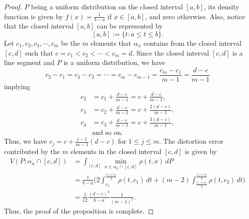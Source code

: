 \documentclass[12pt, reqno]{amsart}
\theoremstyle{plain}
\theoremstyle{definition}
\newcommand{\ii}{\cap}%
\newcommand{\set}[1]{\{#1\}}%
\newcommand{\ga}{\alpha}
\newcommand{\te}{\text}%
\begin{document}
  \begin{proof}
$P$ being a uniform distribution on the closed interval $[a, b]$, its density function is given by $f(x)=\frac {1}{b-a}$ if $x\in [a, b]$, and zero otherwise. Also, notice that 
the closed interval $[a, b]$ can be represented by 
\[[a, b]:=\set{t : a\leq t\leq b}.\]
Let ${c_1, c_2, c_3, \cdots, c_m}$ be the $m$ elements that $\ga_n$ contains from the closed interval $[c, d]$ such that $c=c_1<c_2<\cdots<c_m=d$. 
Since the closed interval $[c, d]$ is a line segment and $P$ is a uniform distribution, we have 
\[c_2-c_1=c_3-c_2=\cdots=c_{m}-c_{m-1}=\frac{c_m-c_1}{m-1}=\frac {d-c}{m-1}\]
implying 
\begin{align*}
c_2&=c_1+\frac {d-c}{m-1}=c+\frac {d-c}{m-1},\\
c_3&=c_2+\frac {d-c}{m-1}=c+\frac {2(d-c)}{m-1}, \\
c_4&=c_3+\frac {d-c}{m-1}=c+\frac {3(d-c)}{m-1},\\
&\te{and so on.}
\end{align*} 
Thus, we have $c_j= c+\frac{j-1}{m-1}(d-c)$ for $ 1\leq j\leq m$. The distortion error contributed by the $m$ elements in the closed interval  $[c, d]$  is given by
 \begin{align*}
V(P; \ga_n\ii [c, d])&=\int_{[c,  d]} \min_{x\in \ga_n\ii[c, d]} \rho(t, x)\, dP\\
&=\frac 1{b-a} \Big(2\int_{c_1}^{\frac  {c_1+c_2}2} \rho(t, c_1)\,dt+(m-2) \int_{\frac  {c_1+c_2}2}^{\frac  {c_2+c_3}2} \rho(t, c_2)\,dt\Big)\\
&=\frac 1 {12}\frac{(d-c)^3}{b-a}\frac 1{ (m-1)^2}.
\end{align*} 
Thus, the proof of the proposition is complete. 
  \end{proof}
  
  
  
\end{document}
